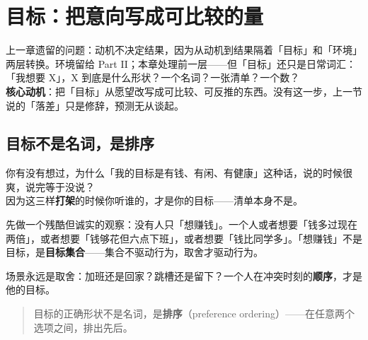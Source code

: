 \documentclass[../../main2.tex]{subfiles}
\begin{document}
\chapter{目标：把意向写成可比较的量}
\label{ch:goal}

\begin{motivation}
	上一章遗留的问题：动机不决定结果，因为从动机到结果隔着「目标」和「环境」两层转换。环境留给 Part II；本章处理前一层——但「目标」还只是日常词汇：「我想要 X」，X 到底是什么形状？一个名词？一张清单？一个数？\\
	\textbf{核心动机}：把「目标」从愿望改写成可比较、可反推的东西。没有这一步，上一节说的「落差」只是修辞，预测无从谈起。
\end{motivation}

\begin{logicmap}
\end{logicmap}

\section{目标不是名词，是排序}

\begin{readingnote}
	你有没有想过，为什么「我的目标是有钱、有闲、有健康」这种话，说的时候很爽，说完等于没说？\\
	因为这三样\textbf{打架}的时候你听谁的，才是你的目标——清单本身不是。
\end{readingnote}

先做一个残酷但诚实的观察：没有人只「想赚钱」。一个人或者想要「钱多过现在两倍」，或者想要「钱够花但六点下班」，或者想要「钱比同学多」。「想赚钱」不是目标，是\textbf{目标集合}——集合不驱动行为，取舍才驱动行为。

场景永远是取舍：加班还是回家？跳槽还是留下？一个人在冲突时刻的\textbf{顺序}，才是他的目标。

\begin{quote}
	目标的正确形状不是名词，是\textbf{排序}（preference ordering）——在任意两个选项之间，排出先后。
\end{quote}
\end{document}
